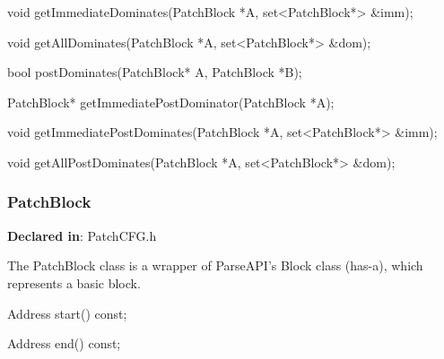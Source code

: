 \begin{apient}
void getImmediateDominates(PatchBlock *A, set<PatchBlock*> &imm);
\end{apient}

\begin{apient}
void getAllDominates(PatchBlock *A, set<PatchBlock*> &dom);
\end{apient}


\begin{apient}
bool postDominates(PatchBlock* A, PatchBlock *B);
\end{apient}

\begin{apient}
PatchBlock* getImmediatePostDominator(PatchBlock *A);
\end{apient}

\begin{apient}
void getImmediatePostDominates(PatchBlock *A, set<PatchBlock*> &imm);
\end{apient}

\begin{apient}
void getAllPostDominates(PatchBlock *A, set<PatchBlock*> &dom);
\end{apient}

\subsubsection{PatchBlock}
\label{sec-3.2.10}

\textbf{Declared in}: PatchCFG.h

The PatchBlock class is a wrapper of ParseAPI's Block class (has-a), which
represents a basic block.


\begin{apient}
Address start() const;
\end{apient}



\begin{apient}
Address end() const;
\end{apient}


